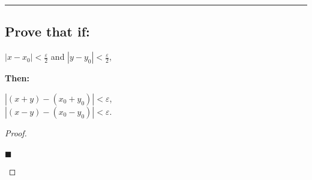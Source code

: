 \documentclass[letterpaper, 10 pt, conference]{ieeeconf}  %
\begin{document}
\noindent\rule{8cm}{0.4pt}

\begin{mdframed}
\subsection{\textbf{Prove that if:}}
\begin{center}
    $\left\lvert x - x_0 \right\rvert < \frac{\varepsilon}{2}$ and $\left\lvert y - y_0 \right\rvert < \frac{\varepsilon}{2}$,
\end{center}
\textbf{Then:}
\begin{center}
    $\left\lvert (x + y)  - (x_0 + y_0)\right\rvert < \varepsilon$, \\
    $\left\lvert (x - y) - (x_0 - y_0)\right\rvert < \varepsilon$.
\end{center}
\end{mdframed}
\begin{proof}
\begin{align}
    
\end{align}
\begin{flushright}
$\blacksquare$
\end{flushright}
\end{proof}
\end{document}
